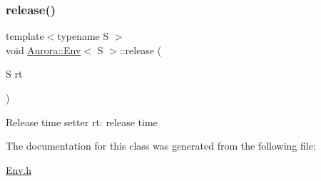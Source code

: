 \subsubsection{\texorpdfstring{release()}{release()}}
{\footnotesize\ttfamily template$<$typename S $>$ \\
void \hyperlink{class_aurora_1_1_env}{Aurora\+::\+Env}$<$ S $>$\+::release (\begin{DoxyParamCaption}\item[{S}]{rt }\end{DoxyParamCaption})\hspace{0.3cm}{\ttfamily [inline]}}

Release time setter rt\+: release time 

The documentation for this class was generated from the following file\+:\begin{DoxyCompactItemize}
\item 
\hyperlink{_env_8h}{Env.\+h}\end{DoxyCompactItemize}
